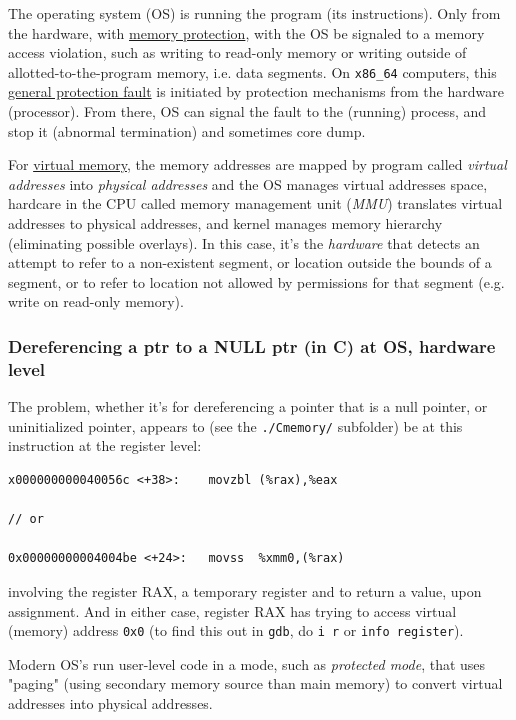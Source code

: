 \documentclass[10pt]{amsart}
\begin{document}
\begin{multicols*}{2}
The operating system (OS) is running the program (its instructions).  Only from the hardware, with \href{https://en.wikipedia.org/wiki/Memory_protection}{memory protection}, with the OS be signaled to a memory access violation, such as writing to read-only memory or writing outside of allotted-to-the-program memory, i.e. data segments.  On \verb|x86_64| computers, this \href{https://en.wikipedia.org/wiki/General_protection_fault}{general protection fault} is initiated by protection mechanisms from the hardware (processor).  From there, OS can signal the fault to the (running) process, and stop it (abnormal termination) and sometimes core dump. 

For \href{https://en.wikipedia.org/wiki/Virtual_memory}{virtual memory}, the memory addresses are mapped by program called \emph{virtual addresses} into \emph{physical addresses} and the OS manages virtual addresses space, hardcare in the CPU called memory management unit (\emph{MMU}) translates virtual addresses to physical addresses, and kernel manages memory hierarchy (eliminating possible overlays).  In this case, it's the \emph{hardware} that detects an attempt to refer to a non-existent segment, or location outside the bounds of a segment, or to refer to location not allowed by permissions for that segment (e.g. write on read-only memory).          

\subsubsection{Dereferencing a ptr to a NULL ptr (in C) at OS, hardware level}

  
The problem, whether it's for dereferencing a pointer that is a null pointer, or uninitialized pointer, appears to (see the \verb|./Cmemory/| subfolder) be at this instruction at the register level:  

\begin{lstlisting}
x000000000040056c <+38>:	movzbl (%rax),%eax

// or 

0x00000000004004be <+24>:	movss  %xmm0,(%rax)  
\end{lstlisting}

involving the register RAX, a temporary register and to return a value, upon assignment.  And in either case, register RAX has trying to access virtual (memory) address \verb|0x0| (to find this out in \verb|gdb|, do \verb|i r| or \verb|info register|).  

Modern OS's run user-level code in a mode, such as \emph{protected mode}, that uses "paging" (using secondary memory source than main memory) to convert virtual addresses into physical addresses.  


\end{multicols*}
\end{document}
